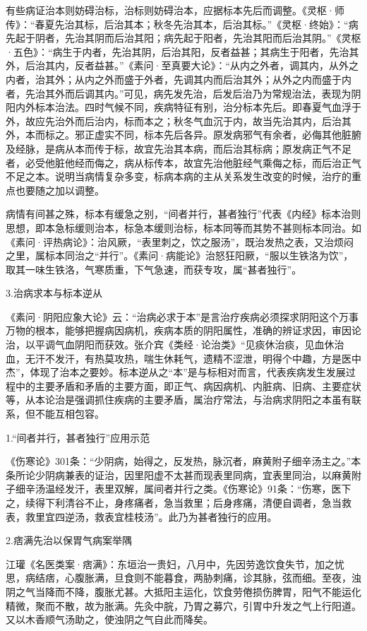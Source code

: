\documentclass[draft,12pt]{ctexbook}
\begin{document}
有些病证治本则妨碍治标，治标则妨碍治本，应据标本先后而调整。《灵枢·师传》：“春夏先治其标，后治其本；秋冬先治其本，后治其标。”《灵枢·终始》：“病先起于阴者，先治其阴而后治其阳；病先起于阳者，先治其阳而后治其阴。”《灵枢·五色》：“病生于内者，先治其阴，后治其阳，反者益甚；其病生于阳者，先治其外，后治其内，反者益甚。”《素问·至真要大论》：“从内之外者，调其内，从外之内者，治其外；从内之外而盛于外者，先调其内而后治其外；从外之内而盛于内者，先治其外而后调其内。”可见，病先发先治，后发后治乃为常规治法，表现为阴阳内外标本治法。四时气候不同，疾病特征有别，治分标本先后。即春夏气血浮于外，故应先治外而后治内，标而本之；秋冬气血沉于内，故当先治其内，后治其外，本而标之。邪正虚实不同，标本先后各异。原发病邪气有余者，必侮其他脏腑及经脉，是病从本而传于标，故宜先治其本病，而后治其标病；原发病正气不足者，必受他脏他经而侮之，病从标传本，故宜先治他脏经气乘侮之标，而后治正气不足之本。说明当病情复杂多变，标病本病的主从关系发生改变的时候，治疗的重点也要随之加以调整。

病情有间甚之殊，标本有缓急之别，“间者并行，甚者独行”代表《内经》标本治则思想，即本急标缓则治本，标急本缓则治标，标本同等而其势不甚则标本同治。如《素问·评热病论》：治风厥，“表里刺之，饮之服汤”，既治发热之表，又治烦闷之里，属标本同治之“并行”。《素问·病能论》治怒狂阳厥，“服以生铁洛为饮”，取其一味生铁洛，气寒质重，下气急速，而获专攻，属“甚者独行”。

3.治病求本与标本逆从

《素问·阴阳应象大论》云：“治病必求于本”是言治疗疾病必须探求阴阳这个万事万物的根本，能够把握病因病机，疾病本质的阴阳属性，准确的辨证求因，审因论治，以平调气血阴阳而获效。张介宾《类经·论治类》“见痰休治痰，见血休治血，无汗不发汗，有热莫攻热，喘生休耗气，遗精不涩泄，明得个中趣，方是医中杰”，体现了治本之要妙。标本逆从之“本”是与标相对而言，代表疾病发生发展过程中的主要矛盾和矛盾的主要方面，即正气、病因病机、内脏病、旧病、主要症状等，从本论治是强调抓住疾病的主要矛盾，属治疗常法，与治病求阴阳之本虽有联系，但不能互相包容。


1.“间者并行，甚者独行”应用示范

《伤寒论》301条：“少阴病，始得之，反发热，脉沉者，麻黄附子细辛汤主之。”本条所论少阴病兼表的证治，因里阳虚不太甚而现表里同病，宜表里同治，以麻黄附子细辛汤温经发汗，表里双解，属间者并行之类。《伤寒论》91条：“伤寒，医下之，续得下利清谷不止，身疼痛者，急当救里；后身疼痛，清便自调者，急当救表，救里宜四逆汤，救表宜桂枝汤”。此乃为甚者独行的应用。

2.痞满先治以保胃气病案举隅

江瓘《名医类案·痞满》：东垣治一贵妇，八月中，先因劳逸饮食失节，加之忧思，病结痞，心腹胀满，旦食则不能暮食，两胁刺痛，诊其脉，弦而细。至夜，浊阴之气当降而不降，腹胀尤甚。大抵阳主运化，饮食劳倦损伤脾胃，阳气不能运化精微，聚而不散，故为胀满。先灸中脘，乃胃之募穴，引胃中升发之气上行阳道。又以木香顺气汤助之，使浊阴之气自此而降矣。
\end{document}
